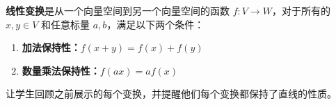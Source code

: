 




\begin{definition}[线性变换]
    \textcolor{third}{\bf 线性变换}是从一个向量空间到另一个向量空间的函数 \(f: V \rightarrow W\)，对于所有的 \(x, y \in V\) 和任意标量 \(a, b\)，满足以下两个条件：

    \begin{enumerate}
        \item \textbf{加法保持性：}\(f(x + y) = f(x) + f(y)\)
        \item \textbf{数量乘法保持性：}\(f(ax) = af(x)\)
    \end{enumerate}
\end{definition}

\begin{note}
  让学生回顾之前展示的每个变换，并提醒他们每个变换都保持了直线的性质。
\end{note}

\vspace*{0.5cm}

